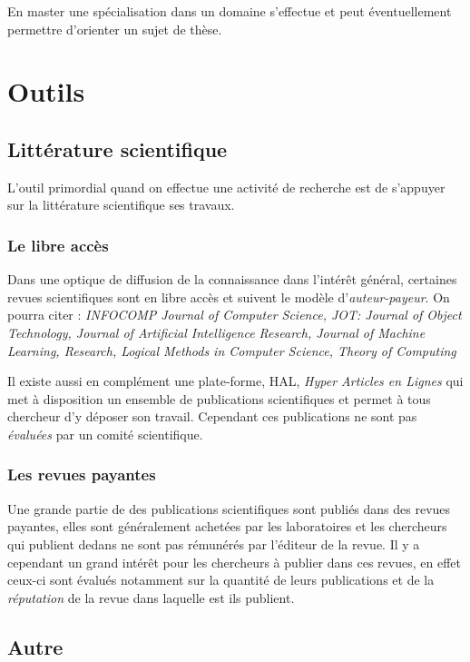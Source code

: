 \documentclass[12pt, a4paper]{report}
\begin{document}
    En master une spécialisation dans un domaine s'effectue et peut éventuellement permettre d'orienter un sujet de thèse.

\chapter{Outils}

  \section{Littérature scientifique}

  L'outil primordial quand on effectue une activité de recherche est de s'appuyer sur la littérature scientifique ses travaux.

	  \subsection{Le libre accès}

	  Dans une optique de diffusion de la connaissance dans l'intérêt général, certaines revues scientifiques sont en libre accès et suivent le modèle d'\emph{auteur-payeur}.
	  On pourra citer : \emph{INFOCOMP Journal of Computer Science, JOT: Journal of Object Technology, Journal of Artificial Intelligence Research, Journal of Machine Learning, Research, Logical Methods in Computer Science, Theory of Computing}

	  Il existe aussi en complément une plate-forme, HAL, \emph{Hyper Articles en Lignes} qui met à disposition un ensemble de publications scientifiques et permet à tous chercheur d'y déposer son travail. Cependant ces publications ne sont pas  \emph{évaluées} par un comité scientifique.

	  \subsection{Les revues payantes}

	  Une grande partie de des publications scientifiques sont publiés dans des revues payantes, elles sont généralement achetées par les laboratoires et les chercheurs qui publient dedans ne sont pas rémunérés par l'éditeur de la revue.
	  Il y a cependant un grand intérêt pour les chercheurs à publier dans ces revues, en effet ceux-ci sont évalués notamment sur la quantité de leurs publications et de la \emph{réputation} de la revue dans laquelle est ils publient.

  \section{Autre}
\end{document}
